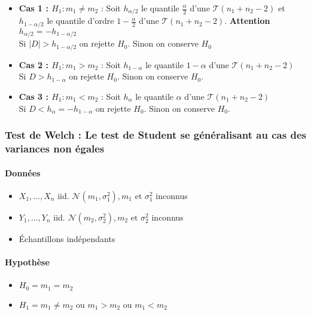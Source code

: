 \documentclass{article}
\theoremstyle{plain}%
\theoremstyle{definition}
\theoremstyle{remark}
\begin{document}
\begin{itemize}
    \item \textbf{Cas 1 : $ H_1: m_1 \neq m_2 $ } : Soit $ h_{\alpha /2} $ le quantile $ \frac{\alpha }{2} $ d'une $ \mathcal{T}(n_1 + n_2 - 2) $  et $ h_{1- \alpha /2} $ le quantile d'ordre $ 1 - \frac{\alpha }{2} $ d'une $ \mathcal{T}(n_1 + n_2 - 2) $. \textbf{Attention} $ h_{\alpha /2} = - h_{1 - \alpha /2} $ \\
    Si $ \left| D \right| > h_{1 - \alpha /2} $ on rejette $ H_0 $. Sinon on conserve $ H_0 $ 

    \item \textbf{Cas 2 : $ H_1: m_1 > m_2 $ } : Soit $ h_{1 - \alpha} $ le quantile $ 1 -\alpha  $ d'une $ \mathcal{T}(n_1 + n_2 - 2) $ \\
    Si $ D > h_{1 - \alpha} $ on rejette $ H_0 $. Sinon on conserve $ H_0 $.

    \item \textbf{Cas 3 : $ H_1: m_1 < m_2 $ } : Soit $ h_{\alpha} $ le quantile $ \alpha $ d'une $ \mathcal{T}(n_1 + n_2 - 2) $ \\
    Si $ D < h_{\alpha} = - h_{1 - \alpha } $ on rejette $ H_0 $. Sinon on conserve $ H_0 $.
\end{itemize}

\subsubsection{Test de Welch : Le test de Student se généralisant au cas des variances non égales}
\paragraph*{Données}
\begin{itemize}
    \item $ X_1, \dots, X_n  $ iid. $ \mathcal{N}(m_1, \sigma_1 ^2), m_1 \text{ et }\sigma_1^2 $ inconnus
    \item $ Y_1, \dots, Y_n  $ iid. $ \mathcal{N}(m_2, \sigma_2 ^2), m_2 \text{ et }\sigma_2^2 $ inconnus
    \item Échantillons indépendants
\end{itemize}

\paragraph*{Hypothèse}
\begin{itemize}
    \item $ H_0 = m_1 = m_2 $ 
    \item $ H_1 = m_1 \neq m_2 $ ou $ m_1 > m_2 $ ou $ m_1 < m_2 $ 
\end{itemize}
\end{document}
